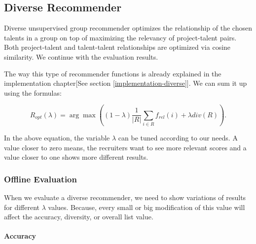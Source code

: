 \subsection{Diverse Recommender}

Diverse unsupervised group recommender optimizes the relationship of the chosen talents in a group on top of maximizing the relevancy of project-talent pairs. Both project-talent and talent-talent relationships are optimized via cosine similarity. We continue with the evaluation results.

The way this type of recommender functions is already explained in the implementation chapter[See section \ref{implementation-diverse}]. We can sum it up using the formulas:

\begin{equation}
R _ { o p t } ( \lambda ) =  { \arg \max } (( 1 - \lambda ) \frac { 1 } { | R | } \sum _ { i \in R } f _ { r e l } ( i ) + \lambda d i v ( R ) ).
\end{equation}

In the above equation, the variable $\lambda$ can be tuned according to our needs. A value closer to zero means, the recruiters want to see more relevant scores and a value closer to one shows more different results. 

\subsubsection{Offline Evaluation}

When we evaluate a diverse recommender, we need to show variations of results for different $\lambda$ values. Because, every small or big modification of this value will affect the accuracy, diversity, or overall list value.

\paragraph{Accuracy}

